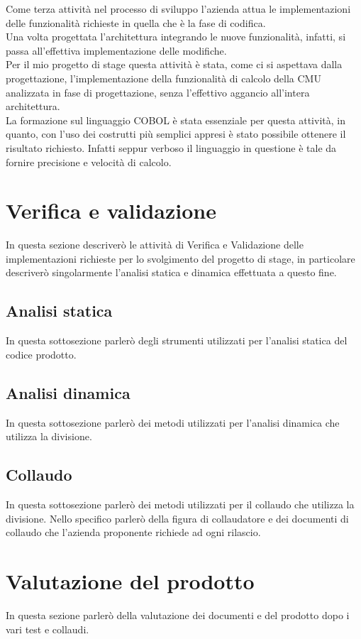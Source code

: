 	Come terza attività nel processo di sviluppo l'azienda attua le implementazioni delle funzionalità richieste in quella che è la fase di codifica.\\	
		
	Una volta progettata l'architettura integrando le nuove funzionalità, infatti, si passa all'effettiva implementazione delle modifiche.\\

	Per il mio progetto di stage questa attività è stata, come ci si aspettava dalla progettazione, l'implementazione della funzionalità di calcolo della CMU analizzata in fase di progettazione, senza l'effettivo aggancio all'intera architettura.\\
	
	La formazione sul linguaggio COBOL è stata essenziale per questa attività, in quanto, con l'uso dei costrutti più semplici appresi è stato possibile ottenere il risultato richiesto. Infatti seppur verboso il linguaggio in questione è tale da fornire precisione e velocità di calcolo.
	
\section{Verifica e validazione}
In questa sezione descriverò le attività di Verifica e Validazione delle implementazioni richieste per lo svolgimento del progetto di stage, in particolare descriverò singolarmente l'analisi statica e dinamica effettuata a questo fine.

\subsection{Analisi statica}
In questa sottosezione parlerò degli strumenti utilizzati per l'analisi statica del codice prodotto.
	
\subsection{Analisi dinamica}
In questa sottosezione parlerò dei metodi utilizzati per l'analisi dinamica che utilizza la divisione.

\subsection{Collaudo}
In questa sottosezione parlerò dei metodi utilizzati per il collaudo che utilizza la divisione. Nello specifico parlerò della figura di collaudatore e dei documenti di collaudo che l'azienda proponente richiede ad ogni rilascio.
	
\section{Valutazione del prodotto}
In questa sezione parlerò della valutazione dei documenti e del prodotto dopo i vari test e collaudi.